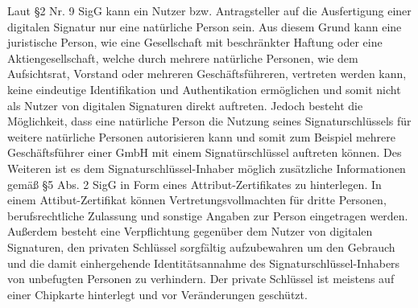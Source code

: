 Laut \S 2 Nr. 9 SigG kann ein Nutzer bzw. Antragsteller auf die Ausfertigung einer digitalen Signatur nur eine natürliche Person sein. Aus diesem Grund kann eine juristische Person, wie eine Gesellschaft mit beschränkter Haftung oder eine Aktiengesellschaft, welche durch mehrere natürliche Personen, wie dem Aufsichtsrat, Vorstand oder mehreren Geschäftsführeren, vertreten werden kann, keine eindeutige Identifikation und Authentikation ermöglichen und somit nicht als Nutzer von digitalen Signaturen direkt auftreten. Jedoch besteht die Möglichkeit, dass eine natürliche Person die Nutzung seines Signaturschlüssels für weitere natürliche Personen autorisieren kann und somit zum Beispiel mehrere Geschäftsführer einer GmbH mit einem Signatürschlüssel auftreten können. Des Weiteren ist es dem Signaturschlüssel-Inhaber möglich zusätzliche Informationen gemäß \S 5 Abs. 2 SigG in Form eines Attribut-Zertifikates zu hinterlegen. In einem Attibut-Zertifikat können Vertretungsvollmachten für dritte Personen, berufsrechtliche Zulassung und sonstige Angaben zur Person eingetragen werden. Außerdem besteht eine Verpflichtung gegenüber dem Nutzer von digitalen Signaturen, den privaten Schlüssel sorgfältig aufzubewahren um den Gebrauch und die damit einhergehende Identitätsannahme des Signaturschlüssel-Inhabers von unbefugten Personen zu verhindern. Der private Schlüssel ist meistens auf einer Chipkarte hinterlegt und vor Veränderungen geschützt. \cite{standdeswissens3}\cite{standdeswissens4}
